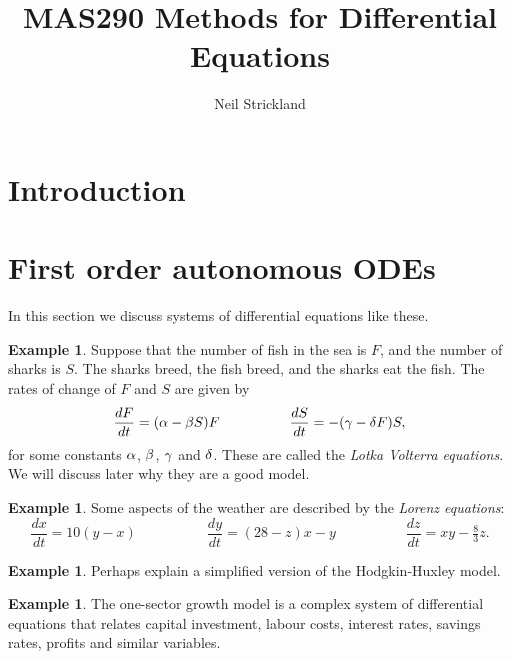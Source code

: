 \documentclass[reqno]{amsart}
\theoremstyle{definition}
\newtheorem{example}[theorem]{Example}
\begin{document}
\title{MAS290 Methods for Differential Equations}
\author{Neil Strickland}

\maketitle

\tableofcontents 

\section{Introduction}
\label{sec-intro}

\section{First order autonomous ODEs}

In this section we discuss systems of differential equations like these.

\begin{example}
 Suppose that the number of fish in the sea is $F$, and the number of
 sharks is $S$.  The sharks breed, the fish breed, and the sharks eat
 the fish.  The rates of change of $F$ and $S$ are given by 
 \[ \frac{dF}{dt} = (\alpha - \beta S)F \hspace{5em}
    \frac{dS}{dt} = -(\gamma - \delta F)S, 
 \]
 for some constants $\alpha$, $\beta$, $\gamma$ and $\delta$.  These are called
 the \emph{Lotka Volterra equations}.  We will discuss later why they
 are a good model.
\end{example}

\begin{example}
 Some aspects of the weather are described by the \emph{Lorenz equations}:
 \[ \frac{dx}{dt} = 10(y-x) \hspace{5em}
    \frac{dy}{dt} = (28-z)x-y \hspace{5em}
    \frac{dz}{dt} = xy - \tfrac{8}{3}z.
 \]
\end{example}

\begin{example}
 Perhaps explain a simplified version of the Hodgkin-Huxley model.
\end{example}

\begin{example}
 The one-sector growth model is a complex system of differential
 equations that relates capital investment, labour costs, interest
 rates, savings rates, profits and similar variables.
\end{example}
\end{document}
